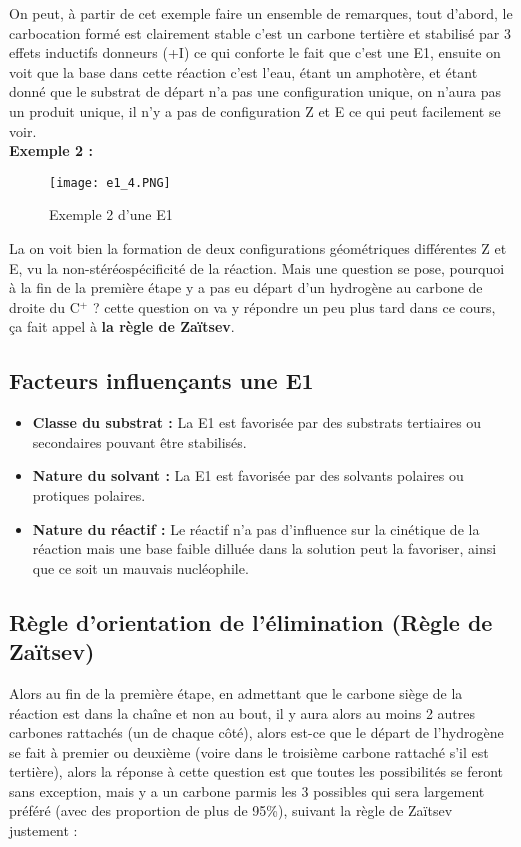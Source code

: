 \documentclass[a4paper, oneside]{book}
\begin{document}
On peut, à partir de cet exemple faire un ensemble de remarques, tout d'abord, le carbocation formé est clairement stable c'est un carbone tertière et stabilisé par 3 effets inductifs donneurs (+I) ce qui conforte le fait que c'est une E1, ensuite on voit que la base dans cette réaction c'est l'eau, étant un amphotère, et étant donné que le substrat de départ n'a pas une configuration unique, on n'aura pas un produit unique, il n'y a pas de configuration Z et E ce qui peut facilement se voir.\\
\textbf{Exemple 2 :}
\begin{figure}[!h]
    \centering
    \texttt{[image: e1\_4.PNG]}
    \caption{Exemple 2 d'une E1}
    \label{fig:my_label}
\end{figure}

La on voit bien la formation de deux configurations géométriques différentes Z et E, vu la non-stéréospécificité de la réaction. Mais une question se pose, pourquoi à la fin de la première étape y a pas eu départ d'un hydrogène au carbone de droite du C$^+$ ? cette question on va y répondre un peu plus tard dans ce cours, ça fait appel à \textbf{la règle de Zaïtsev}.
\subsection{Facteurs influençants une E1}
\begin{itemize}
    \item \textbf{Classe du substrat :} La E1 est favorisée par des substrats tertiaires ou secondaires pouvant être stabilisés.
    \item \textbf{Nature du solvant :} La E1 est favorisée par des solvants polaires ou protiques polaires.
    \item \textbf{Nature du réactif :} Le réactif n'a pas d'influence sur la cinétique de la réaction mais une base faible dilluée dans la solution peut la favoriser, ainsi que ce soit un mauvais nucléophile.
\end{itemize}
\subsection{Règle d'orientation de l'élimination (Règle de Zaïtsev)}
Alors au fin de la première étape, en admettant que le carbone siège de la réaction est dans la chaîne et non au bout, il y aura alors au moins 2 autres carbones rattachés (un de chaque côté), alors est-ce que le départ de l'hydrogène se fait à premier ou deuxième (voire dans le troisième carbone rattaché s'il est tertière), alors la réponse à cette question est que toutes les possibilités se feront sans exception, mais y a un carbone parmis les 3 possibles qui sera largement préféré (avec des proportion de plus de 95\%), suivant la règle de Zaïtsev justement :
\end{document}

